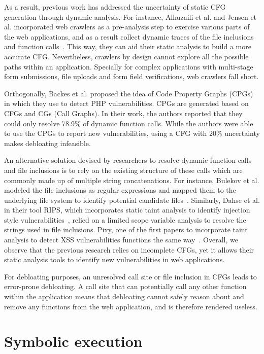 As a result, previous work has addressed the uncertainty of static CFG generation through dynamic analysis. 
For instance, Alhuzaili et al. and Jensen et al. incorporated web crawlers as a pre-analysis step to exercise various parts of the web applications, and as a result collect dynamic traces of the file inclusions and function calls~\cite{alhuzali2018navex, jensen2012thaps}. 
This way, they can aid their static analysis to build a more accurate CFG. 
Nevertheless, crawlers by design cannot explore all the possible paths within an application. 
Specially for complex applications with multi-stage form submissions, file uploads and form field verifications, web crawlers fall short. 

Orthogonally, Backes et al. proposed the idea of Code Property Graphs (CPGs) in which they use to detect PHP vulnerabilities. 
CPGs are generated based on CFGs and CGs (Call Graphs). 
In their work, the authors reported that they could only resolve 78.9\% of dynamic function calls. 
While the authors were able to use the CPGs to report new vulnerabilities, using a CFG with 20\% uncertainty makes debloating infeasible. 

An alternative solution devised by researchers to resolve dynamic function calls and file inclusions is to rely on the existing structure of these calls which are commonly made up of multiple string concatenations. 
For instance, Bulekov et al. modeled the file inclusions as regular expressions and mapped them to the underlying file system to identify potential candidate files~\cite{saphire}. 
Similarly, Dahse et al. in their tool RIPS, which incorporates static taint analysis to identify injection style vulnerabilities~\cite{dahse2010rips}, relied on a limited scope variable analysis to resolve the strings used in file inclusions. 
Pixy, one of the first papers to incorporate taint analysis to detect XSS vulnerabilities functions the same way~\cite{jovanovic2006pixy}. 
Overall, we observe that the previous research relies on incomplete CFGs, yet it allows their static analysis tools to identify new vulnerabilities in web applications.

For debloating purposes, an unresolved call site or file inclusion in CFGs leads to error-prone debloating. 
A call site that can potentially call any other function within the application means that debloating cannot safely reason about and remove any functions from the web application, and is therefore rendered useless. 

\section{Symbolic execution}

